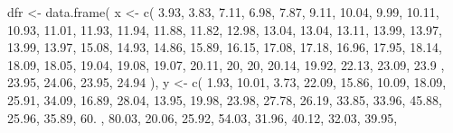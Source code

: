 \documentclass[
  letterpaper,
  DIV=11,
  numbers=noendperiod]{scrreprt}
\newenvironment{Shaded}{\begin{snugshade}}{\end{snugshade}}
\newcommand{\DecValTok}[1]{\textcolor[rgb]{0.68,0.00,0.00}{#1}}
\newcommand{\FloatTok}[1]{\textcolor[rgb]{0.68,0.00,0.00}{#1}}
\newcommand{\FunctionTok}[1]{\textcolor[rgb]{0.28,0.35,0.67}{#1}}
\newcommand{\NormalTok}[1]{\textcolor[rgb]{0.00,0.23,0.31}{#1}}
\newcommand{\OtherTok}[1]{\textcolor[rgb]{0.00,0.23,0.31}{#1}}
\begin{document}
\begin{Shaded}
\begin{Highlighting}[]
\NormalTok{dfr }\OtherTok{\textless{}{-}} \FunctionTok{data.frame}\NormalTok{(}
\NormalTok{  x }\OtherTok{\textless{}{-}} \FunctionTok{c}\NormalTok{( }\FloatTok{3.93}\NormalTok{,  }\FloatTok{3.83}\NormalTok{,  }\FloatTok{7.11}\NormalTok{,  }\FloatTok{6.98}\NormalTok{,  }\FloatTok{7.87}\NormalTok{,  }\FloatTok{9.11}\NormalTok{, }\FloatTok{10.04}\NormalTok{,  }\FloatTok{9.99}\NormalTok{, }\FloatTok{10.11}\NormalTok{, }\FloatTok{10.93}\NormalTok{, }
         \FloatTok{11.01}\NormalTok{, }\FloatTok{11.93}\NormalTok{, }\FloatTok{11.94}\NormalTok{, }\FloatTok{11.88}\NormalTok{, }\FloatTok{11.82}\NormalTok{, }\FloatTok{12.98}\NormalTok{, }\FloatTok{13.04}\NormalTok{, }\FloatTok{13.04}\NormalTok{, }\FloatTok{13.11}\NormalTok{, }\FloatTok{13.99}\NormalTok{, }
         \FloatTok{13.97}\NormalTok{, }\FloatTok{13.99}\NormalTok{, }\FloatTok{13.97}\NormalTok{, }\FloatTok{15.08}\NormalTok{, }\FloatTok{14.93}\NormalTok{, }\FloatTok{14.86}\NormalTok{, }\FloatTok{15.89}\NormalTok{, }\FloatTok{16.15}\NormalTok{, }\FloatTok{17.08}\NormalTok{, }\FloatTok{17.18}\NormalTok{, }
         \FloatTok{16.96}\NormalTok{, }\FloatTok{17.95}\NormalTok{, }\FloatTok{18.14}\NormalTok{, }\FloatTok{18.09}\NormalTok{, }\FloatTok{18.05}\NormalTok{, }\FloatTok{19.04}\NormalTok{, }\FloatTok{19.08}\NormalTok{, }\FloatTok{19.07}\NormalTok{, }\FloatTok{20.11}\NormalTok{, }\DecValTok{20}\NormalTok{, }
         \DecValTok{20}\NormalTok{,    }\FloatTok{20.14}\NormalTok{, }\FloatTok{19.92}\NormalTok{, }\FloatTok{22.13}\NormalTok{, }\FloatTok{23.09}\NormalTok{, }\FloatTok{23.9}\NormalTok{ , }\FloatTok{23.95}\NormalTok{, }\FloatTok{24.06}\NormalTok{, }\FloatTok{23.95}\NormalTok{, }\FloatTok{24.94}
\NormalTok{  ),}
\NormalTok{  y }\OtherTok{\textless{}{-}} \FunctionTok{c}\NormalTok{( }\FloatTok{1.93}\NormalTok{, }\FloatTok{10.01}\NormalTok{,  }\FloatTok{3.73}\NormalTok{, }\FloatTok{22.09}\NormalTok{, }\FloatTok{15.86}\NormalTok{, }\FloatTok{10.09}\NormalTok{, }\FloatTok{18.09}\NormalTok{, }\FloatTok{25.91}\NormalTok{, }\FloatTok{34.09}\NormalTok{, }\FloatTok{16.89}\NormalTok{, }
         \FloatTok{28.04}\NormalTok{, }\FloatTok{13.95}\NormalTok{, }\FloatTok{19.98}\NormalTok{, }\FloatTok{23.98}\NormalTok{, }\FloatTok{27.78}\NormalTok{, }\FloatTok{26.19}\NormalTok{, }\FloatTok{33.85}\NormalTok{, }\FloatTok{33.96}\NormalTok{, }\FloatTok{45.88}\NormalTok{, }\FloatTok{25.96}\NormalTok{, }
         \FloatTok{35.89}\NormalTok{, }\FloatTok{60.}\NormalTok{  , }\FloatTok{80.03}\NormalTok{, }\FloatTok{20.06}\NormalTok{, }\FloatTok{25.92}\NormalTok{, }\FloatTok{54.03}\NormalTok{, }\FloatTok{31.96}\NormalTok{, }\FloatTok{40.12}\NormalTok{, }\FloatTok{32.03}\NormalTok{, }\FloatTok{39.95}\NormalTok{, }

\end{Highlighting}
\end{Shaded}
\end{document}
